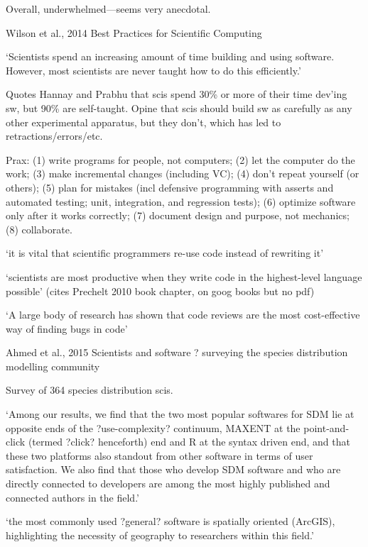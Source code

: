 \documentclass[12pt]{amsart}
\begin{document}
Overall, underwhelmed---seems very anecdotal.



Wilson et al., 2014 Best Practices for Scientific Computing

`Scientists spend an increasing amount of time building and using software. However, most scientists are never taught how to do this efficiently.'

Quotes Hannay and Prabhu that scis spend 30\% or more of their time dev'ing sw, but 90\% are self-taught. Opine that scis should build sw as carefully as any other experimental apparatus, but they don't, which has led to retractions/errors/etc. 

Prax: (1) write programs for people, not computers; (2) let the computer do the work; (3) make incremental changes (including VC); (4) don't repeat yourself (or others); (5) plan for mistakes (incl defensive programming with asserts and automated testing; unit, integration, and regression tests); (6) optimize software only after it works correctly; (7) document design and purpose, not mechanics; (8) collaborate.

`it is vital that scientific programmers re-use code instead of rewriting it'

`scientists are most productive when they write code in the highest-level language possible' (cites Prechelt 2010 book chapter, on goog books but no pdf)

`A large body of research has shown that code reviews are the most cost-effective way of finding bugs in code'



Ahmed et al., 2015 Scientists and software ? surveying the
species distribution modelling
community

Survey of 364 species distribution scis. 

`Among our results, we find that the two most popular softwares for SDM lie at opposite ends of the ?use-complexity? continuum, MAXENT at the point-and-click (termed ?click? henceforth) end and R at the syntax driven end, and that these two platforms also standout from other software in terms of user satisfaction. We also find that those who develop SDM software and who are directly connected to developers are among the most highly published and connected authors in the field.'

`the most commonly used ?general? software is spatially oriented (ArcGIS), highlighting the necessity of geography to researchers within this field.'
\end{document}
